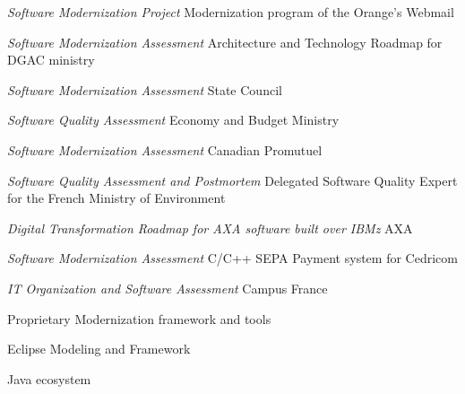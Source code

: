 \begin{cventries}
{{\begin{cvitems}
            \item{\emph{Software Modernization Project} Modernization program of the Orange's Webmail}
            \item{\emph{Software Modernization Assessment} Architecture and Technology Roadmap for DGAC ministry}
            \item{\emph{Software Modernization Assessment} State Council}
            \item{\emph{Software Quality Assessment} Economy and Budget Ministry}
            \item{\emph{Software Modernization Assessment} Canadian Promutuel}
            \item{\emph{Software Quality Assessment and Postmortem} Delegated Software Quality Expert for the French Ministry of Environment}
            \item{\emph{Digital Transformation Roadmap for AXA software built over IBMz} AXA}
            \item{\emph{Software Modernization Assessment} C/C++ SEPA Payment system for Cedricom}
            \item{\emph{IT Organization and Software Assessment} Campus France}
            \end{cvitems}
        }
        {
            \begin{cvitems} %
                \item{Proprietary Modernization framework and tools}
                \item{Eclipse Modeling and Framework}
                \item{Java ecosystem}
            \end{cvitems}
        }
    }




\end{cventries}
